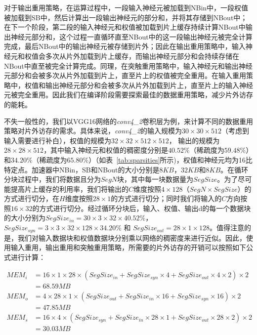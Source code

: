 对于输出重用策略，在运算过程中，一段输入神经元被加载到NBin中，一段权值被加载到SB中，然后计算出一段输出神经元的部分和，并将其存储到NBout中；在下一个阶段，第二段的输入神经元和权值被加载到片上缓存持续计算NBout中输出神经元部分和，这个过程一直循环直至NBout中的这一段输出神经元被完全计算完成，最后NBout中的输出神经元被存储到片外；因此在输出重用策略中，输入神经元和权值会多次从片外加载到片上缓存，而输出神经元部分和会持续存储在NBout中直至被完全计算完成。同理，在突触重用策略中，输入神经元和输出神经元部分和会被多次从片外加载到片上，直至片上的权值被完全重用。在输入重用策略中，权值和输出神经元部分和会被多次从片外加载到片上，直至片上的输入神经元被完全重用。因此我们在编译阶段需要探索最佳的数据重用策略，减少片外访存的能耗。

不失一般性的，我们以VGG16网络的\emph{conv4\_2}卷积层为例，来计算不同的数据重用策略对片外访存的需求。具体来说，\emph{conv4\_2}的输入规模为$30\times 30\times 512$（考虑到输入需要进行补白），权值的规模为$32\times 32\times 512\times 512$， 输出的规模为$28\times 28\times 512$，其中输入神经元和权值的稠密度分别是$40.52\%$（稀疏度为$59.48\%$）和$34.20\%$（稀疏度为$65.80\%$）（如表~\ref{tab:sparsities}所示)，权值和神经元均为16比特定点。加速器中NBin，SB和NBout的大小分别是$8KB$，$32KB$和$8KB$。在循环分块过程中，我们将数据且分为$SegN$块，其中每一块数据量为$SegSize$。为了尽可能提高片上缓存的利用率，我们将输出的$C$维度按照$4\times 128$（$SegN\times SegSize$）的方式进行切分，在$H$维度按照$28\times 1$的方式进行切分；同时我们将输入的$C$方向按照$16\times 32$的方式进行切分。经过循环分块后，输入、权值、输出d的每一个数据块的大小分别为$SegSize_{in} = 30\times 3\times 32\times 40.52\%$， $SegSize_{syn} = 3\times 3\times 32\times 128\times 34.20\%$ 和 $SegSize_{out} = 28\times 1\times 128$。值得注意的是，我们对输入数据块和权值数据块分别乘以网络的稠密度来进行近似。因此，使用输入重用，输出重用和突触重用策略，所需要的片外访存的开销可以按照如下公式进行计算：

\begin{align*}
MEM_{i} & = 16 \times 1 \times 28 \times (SegSize_{in} + SegSize_{syn} \times 4 + SegSize_{out} \times 4 \times 2)\times 2 \\
      & = 68.59MB \\
MEM_{o} & = 4 \times 28 \times 1 \times (SegSize_{out} + SegSize_{in} \times 16 + SegSize_{syn} \times 16)\times 2 \\
      & = 47.85MB \\
MEM_{s} & = 16 \times 4 \times (SegSize_{syn} + SegSize_{in} \times 28 \times 1 + SegSize_{out} \times 28 \times 2)\times 2 \\
      & = 30.03MB 
\end{align*}

